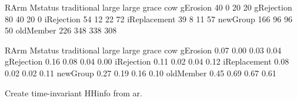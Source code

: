 \begin{Schunk}
\begin{Soutput}
              RArm
Mstatus        traditional large large grace cow
  gErosion              40     0          20  20
  gRejection            80    40          20   0
  iRejection            54    12          22  72
  iReplacement          39     8          11  57
  newGroup             166    96          96  50
  oldMember            226   348         338 308
\end{Soutput}
\end{Schunk}
\begin{Schunk}
\begin{Soutput}
              RArm
Mstatus        traditional large large grace  cow
  gErosion            0.07  0.00        0.03 0.04
  gRejection          0.16  0.08        0.04 0.00
  iRejection          0.11  0.02        0.04 0.12
  iReplacement        0.08  0.02        0.02 0.11
  newGroup            0.27  0.19        0.16 0.10
  oldMember           0.45  0.69        0.67 0.61
\end{Soutput}
\end{Schunk}

Create time-invariant \textsf{HHinfo} from \textsf{ar}. \gobblepars

